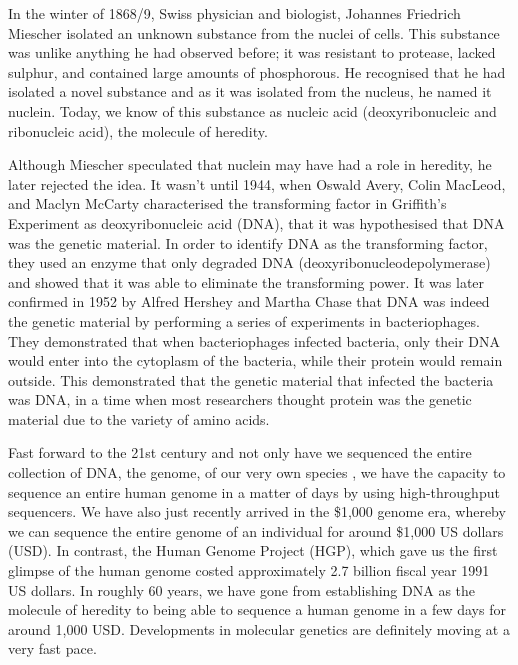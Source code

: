In the winter of 1868/9, Swiss physician and biologist, Johannes Friedrich Miescher isolated an unknown substance from the nuclei of cells\cite{dahm2008discovering}. This substance was unlike anything he had observed before; it was resistant to protease, lacked sulphur, and contained large amounts of phosphorous. He recognised that he had isolated a novel substance and as it was isolated from the nucleus, he named it nuclein. Today, we know of this substance as nucleic acid (deoxyribonucleic and ribonucleic acid), the molecule of heredity.

Although Miescher speculated that nuclein may have had a role in heredity, he later rejected the idea. It wasn't until 1944, when Oswald Avery, Colin MacLeod, and Maclyn McCarty characterised the transforming factor in Griffith's Experiment\cite{griffith1928significance} as deoxyribonucleic acid (DNA), that it was hypothesised that DNA was the genetic material\cite{avery1944studies}. In order to identify DNA as the transforming factor, they used an enzyme that only degraded DNA (deoxyribonucleodepolymerase) and showed that it was able to eliminate the transforming power. It was later confirmed in 1952 by Alfred Hershey and Martha Chase that DNA was indeed the genetic material by performing a series of experiments in bacteriophages\cite{hershey1952independent}. They demonstrated that when bacteriophages infected bacteria, only their DNA would enter into the cytoplasm of the bacteria, while their protein would remain outside. This demonstrated that the genetic material that infected the bacteria was DNA, in a time when most researchers thought protein was the genetic material due to the variety of amino acids.

Fast forward to the 21st century and not only have we sequenced the entire collection of DNA, the genome, of our very own species \cite{venter2001sequence, lander2001initial}, we have the capacity to sequence an entire human genome in a matter of days by using high-throughput sequencers. We have also just recently arrived in the \$1,000 genome era, whereby we can sequence the entire genome of an individual for around \$1,000 US dollars (USD). In contrast, the Human Genome Project (HGP), which gave us the first glimpse of the human genome costed approximately 2.7 billion fiscal year 1991 US dollars\cite{nhgri2010cost}. In roughly 60 years, we have gone from establishing DNA as the molecule of heredity to being able to sequence a human genome in a few days for around 1,000 USD. Developments in molecular genetics are definitely moving at a very fast pace.

